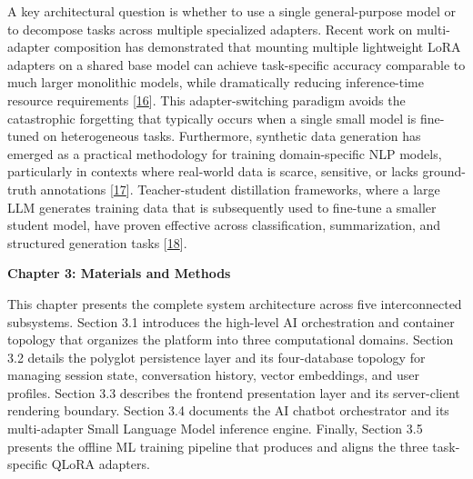 \documentclass[12pt, a4paper]{report}
\begin{document}
A key architectural question is whether to use a single general-purpose model or to decompose tasks across multiple specialized adapters. Recent work on multi-adapter composition has demonstrated that mounting multiple lightweight LoRA adapters on a shared base model can achieve task-specific accuracy comparable to much larger monolithic models, while dramatically reducing inference-time resource requirements [\hyperlink{cite16}{16}]. This adapter-switching paradigm avoids the catastrophic forgetting that typically occurs when a single small model is fine-tuned on heterogeneous tasks. Furthermore, synthetic data generation has emerged as a practical methodology for training domain-specific NLP models, particularly in contexts where real-world data is scarce, sensitive, or lacks ground-truth annotations [\hyperlink{cite17}{17}]. Teacher-student distillation frameworks, where a large LLM generates training data that is subsequently used to fine-tune a smaller student model, have proven effective across classification, summarization, and structured generation tasks [\hyperlink{cite18}{18}].

\newpage
\begin{center}
    {\Huge \textbf{Chapter 3: Materials and Methods}\par}
\end{center}
\vspace{1cm}

\setlength{\parindent}{0.7cm}
\setlength{\parskip}{0.1cm}

This chapter presents the complete system architecture across five interconnected subsystems. Section 3.1 introduces the high-level AI orchestration and container topology that organizes the platform into three computational domains. Section 3.2 details the polyglot persistence layer and its four-database topology for managing session state, conversation history, vector embeddings, and user profiles. Section 3.3 describes the frontend presentation layer and its server-client rendering boundary. Section 3.4 documents the AI chatbot orchestrator and its multi-adapter Small Language Model inference engine. Finally, Section 3.5 presents the offline ML training pipeline that produces and aligns the three task-specific QLoRA adapters.

\vspace{0.8cm}
\vspace{0.4cm}
\end{document}
